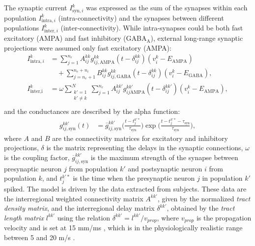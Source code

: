 \documentclass[../main.tex]{subfiles}
\begin{document}
The synaptic current $I^k_{\text{syn},i}$ was expressed as the sum of the synapses within each population $I^k_{\text{intra},i}$ (intra-connectivity)  and the synapses between different populations $I^k_{\text{inter},i}$ (inter-connectivity).
While intra-synapses could be both fast excitatory (AMPA) and fast inhibitory (GABA$_\text{A}$), external long-range synaptic projections were assumed only fast excitatory (AMPA):
\begin{equation}    
    \begin{aligned}
    I^k_{\text{intra},i} & = \displaystyle\sum_{j=1}^{n_e}A^{kk}_{ij}g^{kk}_{ij,\text{AMPA}}(t-\delta^{kk}_{ij})(v^k_i-E_\text{AMPA}) \\
    & \quad + \displaystyle\sum_{j=n_e + 1}^{n_e+n_i}B^{kk}_{ij}g^{kk}_{ij,\text{GABA}}(t-\delta^{kk}_{ij})(v^k_i-E_\text{GABA}), \\
    I^k_{\text{inter,i}} & = \omega
    \displaystyle\sum_{\substack{k'=1\\ k'\neq k}}^{N}
\displaystyle\sum_{j=1}^{n_e}A^{kk'}_{ij}g^{kk'}_{ij\text{AMPA}}(t-\delta^{kk'}_{ij})(v^k_i-E_\text{AMPA}),\\
\end{aligned}
\end{equation}
and the conductances are described by the alpha function:
\begin{equation}
\begin{aligned}
    g^{kk'}_{ij,\text{syn}}(t) & = \bar{g}^{kk'}_{ij,\text{syn}}\bigg(\frac{t-t^{k'*}_j}{\tau_\text{syn}}\bigg)
    \exp\bigg(\displaystyle\frac{t-t^{k'*}_j-\tau_\text{syn}}{\tau_\text{syn}} \bigg),
    \end{aligned}
    \label{eq:snn_syncurrent}
\end{equation}
\noindent where $A$ and $B$ are the connectivity matrices for excitatory and inhibitory projections, $\delta$ is the matrix representing the delays in the synaptic connections, $\omega$ is the coupling factor, $\overline{g}_{ij,\text{syn}}^{kk'}$ is the maximum strength of the synapse between presynaptic neuron $j$ from population $k'$ and postsynaptic neuron $i$ from population $k$, and $t_j^{k'*}$ is the time when the presynaptic neuron $j$ in population $k'$ spiked.
The model is driven by the data extracted from subjects.
These data are the interregional weighted connectivity matrix $A^{kk'}$, given by the normalized \textit{tract density matrix}, and the interregional delay matrix $\delta^{kk'}$, obtained by the \textit{tract length matrix} $l^{kk'}$ using the relation $\delta^{kk'} = l^{kk'}/v_{prop}$, where $v_{prop}$ is the propagation velocity and is set at 15 mm/ms \citep{cabrera-alvarez_modeling_2023}, which is in the physiologically realistic range between 5 and 20 m/s \citep{ghosh2008noise,cabral_role_2011}.
\end{document}
